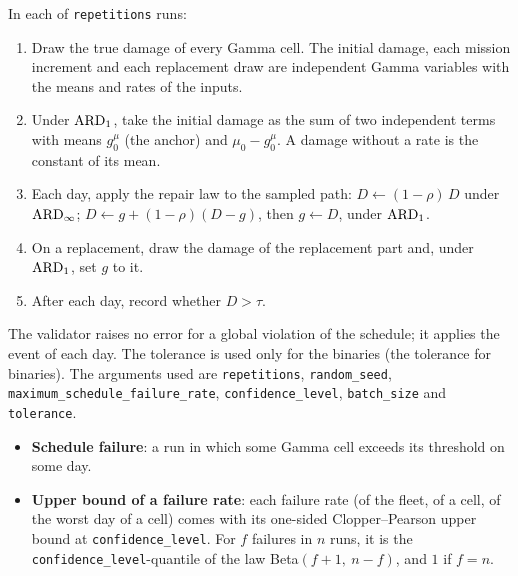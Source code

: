 \tabend

In each of \texttt{repetitions} runs:
\begin{enumerate}[nosep,label=\arabic*.]
  \item Draw the true damage of every Gamma cell. The initial damage, each mission increment and each replacement draw are independent Gamma variables with the means and rates of the inputs.
  \item Under $\mathrm{ARD}_{1}$, take the initial damage as the sum of two independent terms with means $g^{\mu}_0$ (the anchor) and $\mu_0 - g^{\mu}_0$. A damage without a rate is the constant of its mean.
  \item Each day, apply the repair law to the sampled path: $D \leftarrow (1-\rho)\,D$ under $\mathrm{ARD}_{\infty}$; $D \leftarrow g + (1-\rho)(D - g)$, then $g \leftarrow D$, under $\mathrm{ARD}_{1}$.
  \item On a replacement, draw the damage of the replacement part and, under $\mathrm{ARD}_{1}$, set $g$ to it.
  \item After each day, record whether $D > \tau$.
\end{enumerate}
The validator raises no error for a global violation of the schedule; it applies the event of each day. The tolerance is used only for the binaries (the tolerance for binaries). The arguments used are \texttt{repetitions}, \texttt{random\_seed}, \texttt{maximum\_schedule\_failure\_rate}, \texttt{confidence\_level}, \texttt{batch\_size} and \texttt{tolerance}.

\begin{itemize}[nosep,leftmargin=1.5em]
  \item \textbf{Schedule failure}: a run in which some Gamma cell exceeds its threshold on some day.
  \item \textbf{Upper bound of a failure rate}: each failure rate (of the fleet, of a cell, of the worst day of a cell) comes with its one-sided Clopper--Pearson upper bound at \texttt{confidence\_level}. For $f$ failures in $n$ runs, it is the \texttt{confidence\_level}-quantile of the law Beta$(f+1,\ n-f)$, and $1$ if $f = n$.
\end{itemize}

